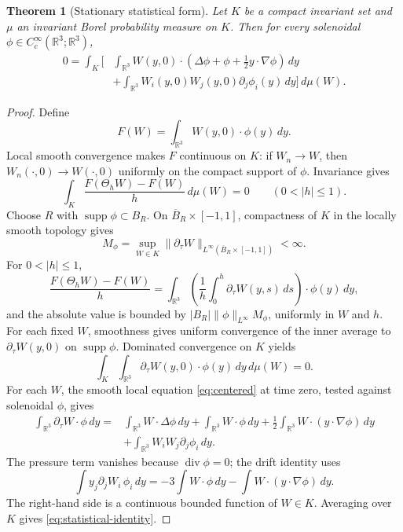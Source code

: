 \documentclass[11pt]{amsart}
\theoremstyle{plain}
\newtheorem{theorem}{Theorem}[section]
\theoremstyle{definition}
\theoremstyle{remark}
\numberwithin{equation}{section}
\newcommand{\R}{\mathbb R}
\newcommand{\supp}{\operatorname{supp}}
\newcommand{\divergence}{\operatorname{div}}
\begin{document}
\begin{theorem}[Stationary statistical form]\label{thm:statistical-identity}
Let \(K\) be a compact invariant set and \(\mu\) an invariant Borel
probability measure on \(K\).  Then for every solenoidal
\(\phi\in C_c^\infty(\R^3;\R^3)\),
\begin{equation}\label{eq:statistical-identity}
\begin{aligned}
0
=
\int_K
\bigg[
   &\int_{\R^3}
   W(y,0)\cdot
   \left(\Delta\phi+\phi+\frac12 y\cdot\nabla\phi\right)\,dy  \\
   &+
   \int_{\R^3}
   W_i(y,0)W_j(y,0)\partial_j\phi_i(y)\,dy
\bigg]\,d\mu(W).
\end{aligned}
\end{equation}
\end{theorem}

\begin{proof}
Define
\[
   F(W)=\int_{\R^3}W(y,0)\cdot\phi(y)\,dy .
\]
Local smooth convergence makes \(F\) continuous on \(K\): if \(W_n\to W\),
then \(W_n(\cdot,0)\to W(\cdot,0)\) uniformly on the compact support of
\(\phi\).  Invariance gives
\[
   \int_K\frac{F(\Theta_hW)-F(W)}{h}\,d\mu(W)=0
   \qquad (0<|h|\le1).
\]
Choose \(R\) with \(\supp\phi\subset B_R\).  On
\(\overline B_R\times[-1,1]\), compactness of \(K\) in the locally smooth
topology gives
\[
   M_\phi
   =
   \sup_{W\in K}
   \|\partial_\tau W\|_{L^\infty(\overline B_R\times[-1,1])}
   <\infty .
\]
For \(0<|h|\le1\),
\[
   \frac{F(\Theta_hW)-F(W)}{h}
   =
   \int_{\R^3}
   \left(\frac1h\int_0^h\partial_\tau W(y,s)\,ds\right)\cdot\phi(y)\,dy,
\]
and the absolute value is bounded by
\(|B_R|\|\phi\|_{L^\infty}M_\phi\), uniformly in \(W\) and \(h\).  For each
fixed \(W\), smoothness gives uniform convergence of the inner average to
\(\partial_\tau W(y,0)\) on \(\supp\phi\).  Dominated convergence on \(K\)
yields
\[
   \int_K\int_{\R^3}\partial_\tau W(y,0)\cdot\phi(y)\,dy\,d\mu(W)=0 .
\]
For each \(W\), the smooth local equation \eqref{eq:centered} at time zero,
tested against solenoidal \(\phi\), gives
\[
\begin{aligned}
\int_{\R^3}\partial_\tau W\cdot\phi\,dy
=
&\int_{\R^3} W\cdot\Delta\phi\,dy
 +\int_{\R^3} W\cdot\phi\,dy
 +\frac12\int_{\R^3}W\cdot(y\cdot\nabla\phi)\,dy\\
&+\int_{\R^3}W_iW_j\partial_j\phi_i\,dy .
\end{aligned}
\]
The pressure term vanishes because \(\divergence\phi=0\); the drift identity
uses
\[
   \int y_j\partial_jW_i\,\phi_i\,dy
   =
   -3\int W\cdot\phi\,dy-\int W\cdot(y\cdot\nabla\phi)\,dy .
\]
The right-hand side is a continuous bounded function of \(W\in K\).  Averaging
over \(K\) gives \eqref{eq:statistical-identity}.
\end{proof}
\end{document}
